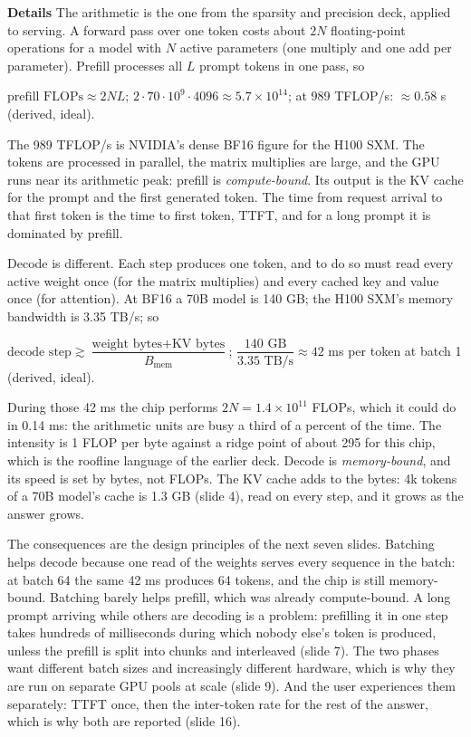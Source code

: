 \documentclass[11pt,letterpaper]{article}
\newcommand{\para}[1]{\medskip\noindent\textbf{#1}\quad}
\newenvironment{formulas}{\begin{tcolorbox}[formulabox]}{\end{tcolorbox}}
\newcommand{\bw}{B_{\mathrm{mem}}}
\begin{document}
\para{Details} The arithmetic is the one from the sparsity and precision deck, applied to serving. A forward pass over one token costs about $2N$ floating-point operations for a model with $N$ active parameters (one multiply and one add per parameter). Prefill processes all $L$ prompt tokens in one pass, so
\begin{formulas}
$\text{prefill FLOPs}\approx2NL$; \qquad $2\cdot70\cdot10^{9}\cdot4096\approx5.7\times10^{14}$; \qquad at 989 TFLOP/s: $\approx0.58$ s (derived, ideal).
\end{formulas}
The 989 TFLOP/s is NVIDIA's dense BF16 figure for the H100 SXM. The tokens are processed in parallel, the matrix multiplies are large, and the GPU runs near its arithmetic peak: prefill is \emph{compute-bound}. Its output is the KV cache for the prompt and the first generated token. The time from request arrival to that first token is the time to first token, TTFT, and for a long prompt it is dominated by prefill.

Decode is different. Each step produces one token, and to do so must read every active weight once (for the matrix multiplies) and every cached key and value once (for attention). At BF16 a 70B model is 140 GB; the H100 SXM's memory bandwidth is 3.35 TB/s; so
\begin{formulas}
$\text{decode step}\gtrsim\dfrac{\text{weight bytes}+\text{KV bytes}}{\bw}$; \qquad $\dfrac{140\text{ GB}}{3.35\text{ TB/s}}\approx42$ ms per token at batch 1 (derived, ideal).
\end{formulas}
During those 42 ms the chip performs $2N=1.4\times10^{11}$ FLOPs, which it could do in 0.14 ms: the arithmetic units are busy a third of a percent of the time. The intensity is 1 FLOP per byte against a ridge point of about 295 for this chip, which is the roofline language of the earlier deck. Decode is \emph{memory-bound}, and its speed is set by bytes, not FLOPs. The KV cache adds to the bytes: 4k tokens of a 70B model's cache is 1.3 GB (slide 4), read on every step, and it grows as the answer grows.

The consequences are the design principles of the next seven slides. Batching helps decode because one read of the weights serves every sequence in the batch: at batch 64 the same 42 ms produces 64 tokens, and the chip is still memory-bound. Batching barely helps prefill, which was already compute-bound. A long prompt arriving while others are decoding is a problem: prefilling it in one step takes hundreds of milliseconds during which nobody else's token is produced, unless the prefill is split into chunks and interleaved (slide 7). The two phases want different batch sizes and increasingly different hardware, which is why they are run on separate GPU pools at scale (slide 9). And the user experiences them separately: TTFT once, then the inter-token rate for the rest of the answer, which is why both are reported (slide 16).
\end{document}
